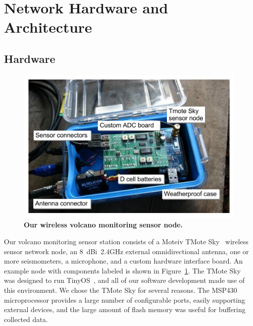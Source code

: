 \section{Network Hardware and Architecture}
\label{evaluation-sec-architecture}

\subsection{Hardware}

\begin{figure}[t]
\begin{center}
\includegraphics[width=1.0\hsize]{./3-evaluation/figs/node.pdf}
\end{center}
\caption{\textbf{Our wireless volcano monitoring sensor node.}}
\label{evaluation-fig-node}
\end{figure}

Our volcano monitoring sensor station consists of a Moteiv TMote
Sky~\cite{moteiv} wireless sensor network node, an 8~dBi~2.4GHz external
omnidirectional antenna, one or more seismometers, a microphone, and a custom
hardware interface board. An example node with components labeled is shown in
Figure~\ref{evaluation-fig-node}. The TMote Sky was designed to run
TinyOS~\cite{tinyos-asplos00}, and all of our software development made use
of this environment. We chose the TMote Sky for several reasons. The MSP430
microprocessor provides a large number of configurable ports, easily
supporting external devices, and the large amount of flash memory was useful
for buffering collected data.

